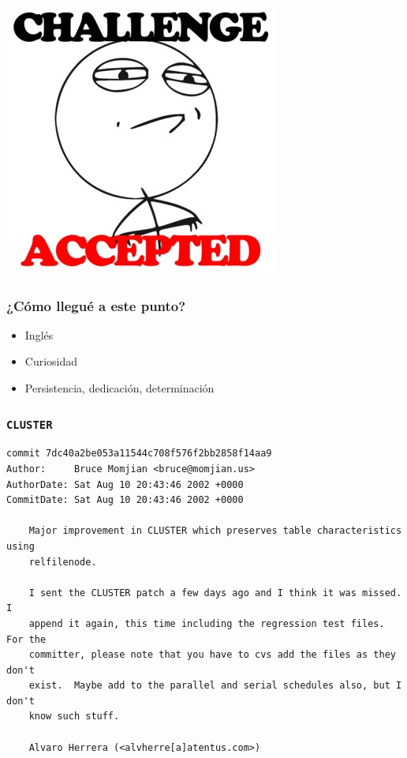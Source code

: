 \begin{frame}
	\center
	\includegraphics[height=0.7\textheight]{Challenge-Accepted.jpg}
\end{frame}

\begin{frame}
  \frametitle{¿Cómo llegué a este punto?}

	\begin{itemize}
		\item Inglés
		\item Curiosidad
		\item Persistencia, dedicación, determinación
	\end{itemize}
\end{frame}

\begin{frame}
\end{frame}

\begin{frame}
\end{frame}

\begin{frame}[containsverbatim]
  \frametitle{\texttt{CLUSTER}}

\footnotesize
\begin{Verbatim}[xleftmargin=-1cm]
commit 7dc40a2be053a11544c708f576f2bb2858f14aa9
Author:     Bruce Momjian <bruce@momjian.us>
AuthorDate: Sat Aug 10 20:43:46 2002 +0000
CommitDate: Sat Aug 10 20:43:46 2002 +0000

    Major improvement in CLUSTER which preserves table characteristics using
    relfilenode.
    
    I sent the CLUSTER patch a few days ago and I think it was missed.  I
    append it again, this time including the regression test files.  For the
    committer, please note that you have to cvs add the files as they don't
    exist.  Maybe add to the parallel and serial schedules also, but I don't
    know such stuff.
    
    Alvaro Herrera (<alvherre[a]atentus.com>)

\end{Verbatim}
\end{frame}


